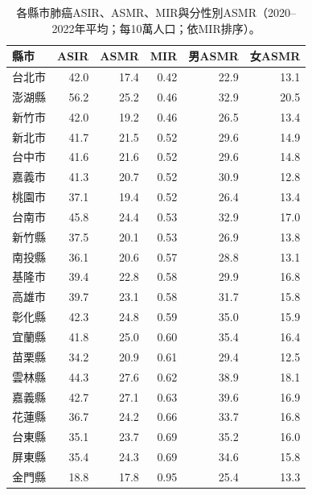 \documentclass[UTF8,a4paper,11pt]{ctexart}
\begin{document}
\begin{table}[H]
\centering
\caption{各縣市肺癌ASIR、ASMR、MIR與分性別ASMR（2020--2022年平均；每10萬人口；依MIR排序）。}\label{tab:mir}
\small
\begin{tabular}{lrrrrr}
\toprule
縣市 & ASIR & ASMR & MIR & 男ASMR & 女ASMR\\
\midrule
台北市 & 42.0 & 17.4 & 0.42 & 22.9 & 13.1\\
澎湖縣 & 56.2 & 25.2 & 0.46 & 32.9 & 20.5\\
新竹市 & 42.0 & 19.2 & 0.46 & 26.5 & 13.4\\
新北市 & 41.7 & 21.5 & 0.52 & 29.6 & 14.9\\
台中市 & 41.6 & 21.6 & 0.52 & 29.6 & 14.8\\
嘉義市 & 41.3 & 20.7 & 0.52 & 30.9 & 12.8\\
桃園市 & 37.1 & 19.4 & 0.52 & 26.4 & 13.4\\
台南市 & 45.8 & 24.4 & 0.53 & 32.9 & 17.0\\
新竹縣 & 37.5 & 20.1 & 0.53 & 26.9 & 13.8\\
南投縣 & 36.1 & 20.6 & 0.57 & 28.8 & 13.1\\
基隆市 & 39.4 & 22.8 & 0.58 & 29.9 & 16.8\\
高雄市 & 39.7 & 23.1 & 0.58 & 31.7 & 15.8\\
彰化縣 & 42.3 & 24.8 & 0.59 & 35.0 & 15.9\\
宜蘭縣 & 41.8 & 25.0 & 0.60 & 35.4 & 16.4\\
苗栗縣 & 34.2 & 20.9 & 0.61 & 29.4 & 12.5\\
雲林縣 & 44.3 & 27.6 & 0.62 & 38.9 & 18.1\\
嘉義縣 & 42.7 & 27.1 & 0.63 & 39.6 & 16.9\\
花蓮縣 & 36.7 & 24.2 & 0.66 & 33.7 & 16.8\\
台東縣 & 35.1 & 23.7 & 0.69 & 35.2 & 16.0\\
屏東縣 & 35.4 & 24.3 & 0.69 & 34.6 & 15.8\\
金門縣 & 18.8 & 17.8 & 0.95 & 25.4 & 13.3\\
\bottomrule
\end{tabular}
\end{table}
\end{document}
